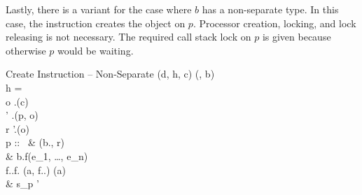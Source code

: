 Lastly, there is a variant for the case where $b$ has a non-separate type. In this case, the instruction creates the object on $p$. Processor creation, locking, and lock releasing is not necessary. The required call stack lock on $p$ is given because otherwise $p$ would be waiting.

\inferencerule
	{Create Instruction -- Non-Separate}
	{
		(d, h, c) \mathematicaldefinition \typefromtypingenvironment(\typingenvironment, b) \\
		h = \bullet \\
		o \mathematicaldefinition \state.\newobjectfeature(c) \\
		\state' \mathematicaldefinition \state.\addobjectfeature(p, o) \\
		r \mathematicaldefinition \state'.(o) \\
	}
	{}
	{
		\configuration
			{
				p :: \ & \writevalueoperation(b.\namefeature, r) \statementseparator \\
				& b.f(e_{1}, \ldots, e_{n}) \statementseparator \\
				\multilineconditionaloperation
						{\neg f.\classtypefeature.\invariantexistsfeature \vee f.\isexportedfeature}
						{\nooperation}
						{\evaluateoperation(a, f.\classtypefeature.\invariantfeature) \statementseparator \waitoperation(a)} \statementseparator \\
				& s_{p}
			}
			{\state'}
	}
 
